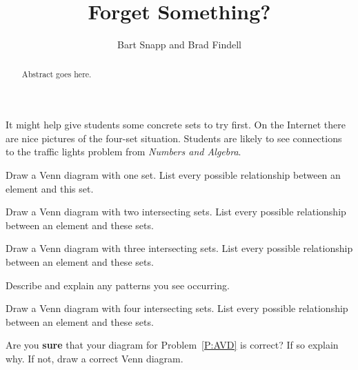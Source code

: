 \documentclass{ximera}
\title{Forget Something?}
\author{Bart Snapp and Brad Findell}
\begin{document}
\begin{abstract}
Abstract goes here.  
\end{abstract}
\maketitle


\begin{teachingnote}
It might help give students some concrete sets to try first.  On the Internet there are nice pictures of the four-set situation. Students are likely to see connections to the traffic lights problem from \emph{Numbers and Algebra}.
\end{teachingnote}

\begin{problem} 
Draw a Venn diagram with one set. List every possible relationship
between an element and this set. 
\end{problem}

\begin{problem} 
Draw a Venn diagram with two intersecting sets. List every possible
relationship between an element and these sets.
\end{problem}


\begin{problem} 
Draw a Venn diagram with three intersecting sets. List every possible
relationship between an element and these sets.
\end{problem}

\begin{problem}
Describe and explain any patterns you see occurring.
\end{problem}

\begin{problem}\label{P:AVD}
Draw a Venn diagram with four intersecting sets. List every possible
relationship between an element and these sets.
\end{problem}

\begin{problem}
Are you \textbf{sure} that your diagram for Problem~\ref{P:AVD} is
correct? If so explain why. If not, draw a correct Venn diagram.
\end{problem}
\end{document}
